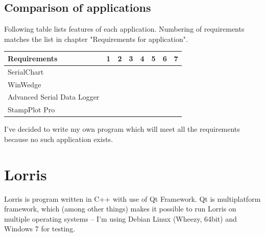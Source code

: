 \documentclass[12pt, a4paper, oneside]{article}
\newcommand{\Has}{\textcolor{green}{\CheckmarkBold}}
\newcommand{\NoHas}{\textcolor{red}{\XSolidBrush}}
\begin{document}
\subsection*{Comparison of applications}
Following table lists features of each application. Numbering of requirements matches the list in chapter "Requirements for application".

\vspace{5mm}

\begin{tabular}{ | l | l | l | l | l | l | l | l |}
    \hline
    Requirements                & 1      & 2      & 3      & 4      & 5      & 6      & 7      \\ \hline
    SerialChart                 & \Has   & \NoHas & \Has   & \NoHas & \Has   & \Has   & \Has   \\ \hline 
    WinWedge                    & \NoHas & \Has   & \Has   & \NoHas & \NoHas & \NoHas & \NoHas \\ \hline 
    Advanced Serial Data Logger & \NoHas & \Has   & \Has   & \NoHas & \NoHas & \NoHas & \NoHas \\ \hline 
    StampPlot Pro               & \Has   & \Has   & \NoHas & \NoHas & \Has   & \NoHas & \Has   \\ \hline 
\end{tabular}

\vspace{5mm}

I've decided to write my own program which will meet all the requirements because no such application exists.

\section{Lorris}
Lorris is program written in C++ with use of Qt Framework\cite{qtfrm}. Qt is multiplatform framework, which (among other things) makes it possible to run Lorris on multiple operating systems -- I'm using Debian Linux\cite{debian} (Wheezy, 64bit) and Windows 7 for testing.
\end{document}
